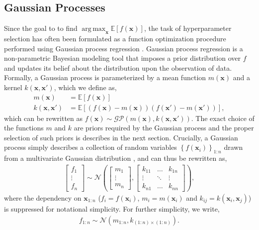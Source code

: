 \documentclass{article}
\DeclareMathOperator*{\argmax}{arg\,max}
\newcommand{\x}{\mathbf{x}}
\newcommand{\N}[1]{\mathcal{N}\left(#1\right)}
\newcommand{\set}[1]{\left\{{#1}\right\}}
\newcommand{\E}[1]{\mathbb{E}\left[#1\right]}
\begin{document}
\subsection{Gaussian Processes}
Since the goal to to find $\argmax_{\x} \E{f(\x)}$, the task of hyperparameter selection has often been formulated as a function optimization procedure performed using Gaussian process regression \cite{adams:practical}. Gaussian process regression is a non-parametric Bayesian modeling tool that imposes a prior distribution over $f$ and updates its belief about the distribution upon the observation of data. Formally, a Gaussian process is parameterized by a mean function $m(\x)$ and a kernel $k(\x, \x')$, which we define as,
\begin{align}
  m(\x) &= \E{f(\x)} \\
  k(\x, \x') &= \E{(f(\x) - m(\x))(f(\x') - m(\x'))},
\end{align}
which can be rewritten as $f(\x) \sim \mathcal{GP}(m(\x), k(\x, \x'))$. The exact choice of the functions $m$ and $k$ are priors required by the Gaussian process and the proper selection of such priors is describes in the next section. Crucially, a Gaussian process simply describes a collection of random variables $\set{f(\x_i)}_{1:n}$ drawn from a multivariate Gaussian distribution \cite{rasmussen:book}, and can thus be rewritten as,
\begin{align}
  \begin{bmatrix}
    f_1 \\ \vdots \\ f_n
  \end{bmatrix} \sim
  \N{\begin{bmatrix} m_1 \\ \vdots \\ m_n \end{bmatrix},
    \begin{bmatrix}
      k_{11} & \ldots & k_{1n} \\
      \vdots & \ddots & \vdots \\
      k_{n1} & \ldots & k_{nn}
  \end{bmatrix}},
\end{align}
where the dependency on $\x_{1:n}$ ($f_i = f(\x_i)$, $m_i = m(\x_i)$ and $k_{ij} = k(\x_i, \x_j)$) is suppressed for notational simplicity. For further simplicity, we write,
\begin{align}
  f_{1:n} \sim \N{m_{1:n}, k_{(1:n) \times (1:n)}}.
\end{align}
\end{document}
